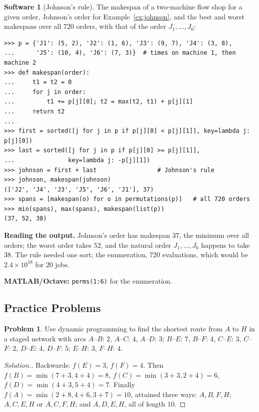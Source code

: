 \documentclass[11pt,a4paper]{article}
\numberwithin{equation}{section}
\theoremstyle{definition}
\newtheorem{software}[thm]{Software}
\newtheorem{problemx}{Problem}[subsection]
\newenvironment{problem}{\begin{problemx}}{\end{problemx}}
\newenvironment{solution}
  {\renewcommand{\qedsymbol}{}\begin{proof}[\textit{Solution}.]}
  {\end{proof}}
\begin{document}
\begin{software}[Johnson's rule]
\label{sw:johnson}
The makespan of a two-machine flow shop for a given order, Johnson's order for Example~\ref{ex:johnson}, and the best and worst makespans over all $720$ orders, with that of the order $J_1, \ldots, J_6$:
{\small\begin{verbatim}
>>> p = {'J1': (5, 2), 'J2': (1, 6), 'J3': (9, 7), 'J4': (3, 8),
...      'J5': (10, 4), 'J6': (7, 3)}  # times on machine 1, then machine 2
>>> def makespan(order):
...     t1 = t2 = 0
...     for j in order:
...         t1 += p[j][0]; t2 = max(t2, t1) + p[j][1]
...     return t2
...
>>> first = sorted([j for j in p if p[j][0] < p[j][1]], key=lambda j: p[j][0])
>>> last = sorted([j for j in p if p[j][0] >= p[j][1]],
...               key=lambda j: -p[j][1])
>>> johnson = first + last                 # Johnson's rule
>>> johnson, makespan(johnson)
(['J2', 'J4', 'J3', 'J5', 'J6', 'J1'], 37)
>>> spans = [makespan(o) for o in permutations(p)]   # all 720 orders
>>> min(spans), max(spans), makespan(list(p))
(37, 52, 38)
\end{verbatim}}
\textbf{Reading the output.} Johnson's order has makespan $37$, the minimum over all orders; the worst order takes $52$, and the natural order $J_1, \ldots, J_6$ happens to take $38$. The rule needed one sort; the enumeration, $720$ evaluations, which would be $2.4 \times 10^{18}$ for $20$ jobs.

\textbf{MATLAB/Octave:} \texttt{perms(1:6)} for the enumeration.
\end{software}

\subsection{Practice Problems}

\begin{problem}
Use dynamic programming to find the shortest route from $A$ to $H$ in a staged network with arcs $A$--$B$: $2$, $A$--$C$: $4$, $A$--$D$: $3$; $B$--$E$: $7$, $B$--$F$: $4$, $C$--$E$: $3$, $C$--$F$: $2$, $D$--$E$: $4$, $D$--$F$: $5$; $E$--$H$: $3$, $F$--$H$: $4$.
\end{problem}

\begin{solution}
Backwards: $f(E) = 3$, $f(F) = 4$. Then $f(B) = \min(7 + 3, 4 + 4) = 8$, $f(C) = \min(3 + 3, 2 + 4) = 6$, $f(D) = \min(4 + 3, 5 + 4) = 7$. Finally $f(A) = \min(2 + 8, 4 + 6, 3 + 7) = 10$, attained three ways: $A, B, F, H$; $A, C, E, H$ or $A, C, F, H$; and $A, D, E, H$, all of length $10$.
\end{solution}
\end{document}
